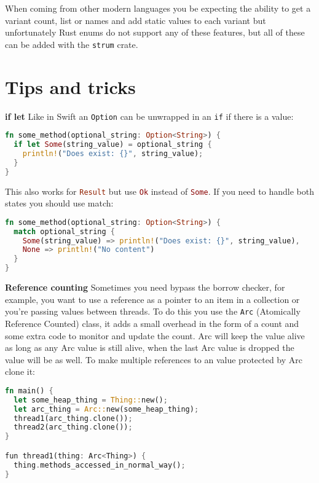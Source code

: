 \documentclass[a4paper,11pt]{article}
\begin{document}
When coming from other modern languages you be expecting the ability to get a variant count, list or names and add static values to each variant but unfortunately Rust enums do not support any of these features, but all of these can be added with the \lstinline{strum} crate. 

\newpage
\section{Tips and tricks}
\medskip
\textbf{if let}
\newline
Like in Swift an \lstinline[language=Kotlin]{Option} can be unwrapped in an \lstinline|if| if there is a value:

\begin{lstlisting}[language=Rust,frame=single]
fn some_method(optional_string: Option<String>) {
  if let Some(string_value) = optional_string {
    println!("Does exist: {}", string_value);
  }
}
\end{lstlisting}

This also works for \lstinline[language=Rust]{Result} but use \lstinline[language=Rust]{Ok} instead of \lstinline[language=Rust]{Some}. If you need to handle both states you should use match:
\begin{lstlisting}[language=Rust,frame=single]
fn some_method(optional_string: Option<String>) {
  match optional_string {
    Some(string_value) => println!("Does exist: {}", string_value),
    None => println!("No content")
  }
}
\end{lstlisting}
\medskip
\medskip
\textbf{Reference counting}
\newline
Sometimes you need bypass the borrow checker, for example, you want to use a reference as a pointer to an item in a collection or you're passing values between threads. To do this you use the \lstinline[language=Rust]{Arc} (Atomically Reference Counted) class, it adds a small overhead in the form of a count and some extra code to monitor and update the count. Arc will keep the value alive as long as any Arc value is still alive, when the last Arc value is dropped the value will be as well. To make multiple references to an value protected by Arc clone it:
\begin{lstlisting}[language=Rust,frame=single]
fn main() {
  let some_heap_thing = Thing::new();
  let arc_thing = Arc::new(some_heap_thing);
  thread1(arc_thing.clone()); 
  thread2(arc_thing.clone()); 
}

fun thread1(thing: Arc<Thing>) {
  thing.methods_accessed_in_normal_way();
}
\end{lstlisting}
\end{document}
